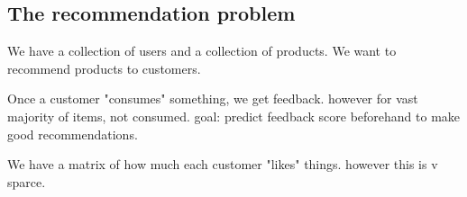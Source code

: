 
\subsection{The recommendation problem}

We have a collection of users and a collection of products. We want to recommend products to customers.

Once a customer "consumes" something, we get feedback. however for vast majority of items, not consumed. goal: predict feedback score beforehand to make good recommendations.

We have a matrix of how much each customer "likes" things. however this is v sparce.

